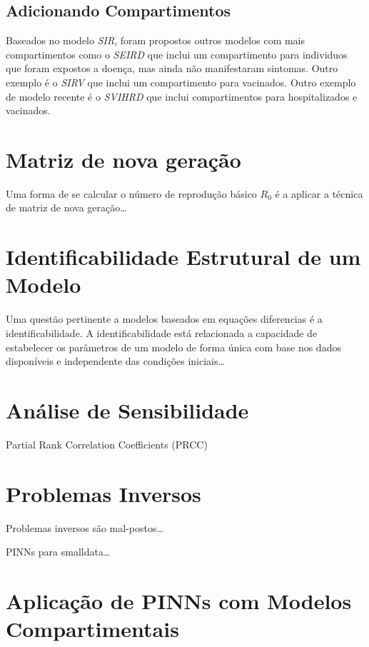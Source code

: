 \subsection{Adicionando Compartimentos}

Baseados no modelo \textit{SIR}, foram propostos outros modelos com mais 
compartimentos como o \textit{SEIRD} \cite{giles:77-sird} que inclui um 
compartimento para individuos que foram expostos a doença, mas 
ainda não manifestaram sintomas. 
Outro exemplo é o \textit{SIRV} \cite{schlickeiser-kroger:21-sirv} 
que inclui um compartimento para vacinados.
Outro exemplo de modelo recente é o \textit{SVIHRD} \cite{nelson-etal:24-japao}
que inclui compartimentos para hospitalizados e vacinados.

\section{Matriz de nova geração}

Uma forma de se calcular o número de reprodução básico $R_0$ é a aplicar a técnica
de matriz de nova geração\dots

\section{Identificabilidade Estrutural de um Modelo}

Uma questão pertinente a modelos baseados em equações diferencias é a 
identificabilidade. A identificabilidade está relacionada a capacidade de 
estabelecer os parâmetros de um modelo de forma única com base nos dados disponíveis
e independente das condições iniciais\dots

\section{Análise de Sensibilidade}

Partial Rank Correlation Coefficients (PRCC)

\section{Problemas Inversos}

Problemas inversos são mal-postos\dots

PINNs para smalldata\dots

\section{Aplicação de PINNs com Modelos Compartimentais}

